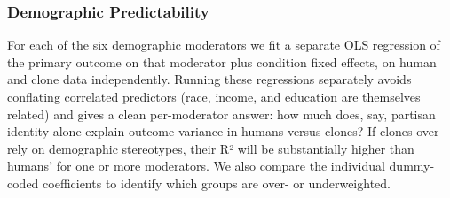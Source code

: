\documentclass[
  letterpaper,
  DIV=11,
  numbers=noendperiod]{scrartcl}
\begin{document}
\begin{table}

\caption{\label{tbl-rq4a}Demographic baseline calibration. For each
moderator, cell means in the control condition are compared. r: Pearson
correlation of cell means. RMSE: root mean squared error. N cells:
number of demographic groups. Left columns: Human 1 vs.~LLM; right
columns: Human 1 vs.~Human 2 (baseline ceiling).}


\end{table}%

\subsubsection{Demographic
Predictability}\label{demographic-predictability}

For each of the six demographic moderators we fit a separate OLS
regression of the primary outcome on that moderator plus condition fixed
effects, on human and clone data independently. Running these
regressions separately avoids conflating correlated predictors (race,
income, and education are themselves related) and gives a clean
per-moderator answer: how much does, say, partisan identity alone
explain outcome variance in humans versus clones? If clones over-rely on
demographic stereotypes, their R² will be substantially higher than
humans' for one or more moderators. We also compare the individual
dummy-coded coefficients to identify which groups are over- or
underweighted.
\end{document}

